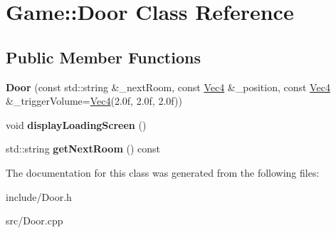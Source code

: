 \hypertarget{classGame_1_1Door}{\section{Game\-:\-:Door Class Reference}
\label{classGame_1_1Door}
}
\subsection*{Public Member Functions}
\begin{DoxyCompactItemize}
\item 
\hypertarget{classGame_1_1Door_a5bed6e03faf4d40d00654c19d3a75871}{{\bfseries Door} (const std\-::string \&\-\_\-next\-Room, const \hyperlink{classVec4}{Vec4} \&\-\_\-position, const \hyperlink{classVec4}{Vec4} \&\-\_\-trigger\-Volume=\hyperlink{classVec4}{Vec4}(2.\-0f, 2.\-0f, 2.\-0f))}\label{classGame_1_1Door_a5bed6e03faf4d40d00654c19d3a75871}

\item 
\hypertarget{classGame_1_1Door_ae65491ca984bf938567678fd1609fcf3}{void {\bfseries display\-Loading\-Screen} ()}\label{classGame_1_1Door_ae65491ca984bf938567678fd1609fcf3}

\item 
\hypertarget{classGame_1_1Door_a1b8035bd01537a2e1d67035c846ef08e}{std\-::string {\bfseries get\-Next\-Room} () const }\label{classGame_1_1Door_a1b8035bd01537a2e1d67035c846ef08e}

\end{DoxyCompactItemize}


The documentation for this class was generated from the following files\-:\begin{DoxyCompactItemize}
\item 
include/Door.\-h\item 
src/Door.\-cpp\end{DoxyCompactItemize}

